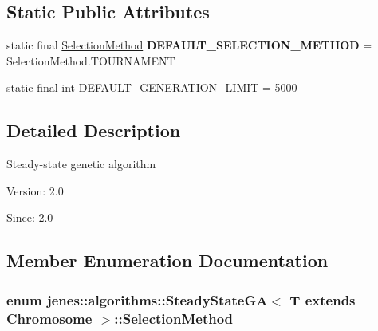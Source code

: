 \subsection*{Static Public Attributes}
\begin{CompactItemize}
\item 
\hypertarget{classjenes_1_1algorithms_1_1_steady_state_g_a_3_01_t_01extends_01_chromosome_01_4_6b63d4f31855f6b9f73d8e35cb76eaee}{
static final \hyperlink{classjenes_1_1algorithms_1_1_steady_state_g_a_3_01_t_01extends_01_chromosome_01_4_e3534264ad652fd69b6d2a619b16e13b}{SelectionMethod} \textbf{DEFAULT\_\-SELECTION\_\-METHOD} = SelectionMethod.TOURNAMENT}
\label{classjenes_1_1algorithms_1_1_steady_state_g_a_3_01_t_01extends_01_chromosome_01_4_6b63d4f31855f6b9f73d8e35cb76eaee}

\item 
static final int \hyperlink{classjenes_1_1algorithms_1_1_steady_state_g_a_3_01_t_01extends_01_chromosome_01_4_d510a7e4a856de7b2c9d021b2f66a5ac}{DEFAULT\_\-GENERATION\_\-LIMIT} = 5000
\end{CompactItemize}


\subsection{Detailed Description}
Steady-state genetic algorithm

\begin{Desc}
\item[Version:]2.0 \end{Desc}
\begin{Desc}
\item[Since:]2.0 \end{Desc}


\subsection{Member Enumeration Documentation}
\hypertarget{classjenes_1_1algorithms_1_1_steady_state_g_a_3_01_t_01extends_01_chromosome_01_4_e3534264ad652fd69b6d2a619b16e13b}{
\subsubsection[SelectionMethod]{\setlength{\rightskip}{0pt plus 5cm}enum jenes::algorithms::SteadyStateGA$<$ T extends Chromosome $>$::{\bf SelectionMethod}}}
\label{classjenes_1_1algorithms_1_1_steady_state_g_a_3_01_t_01extends_01_chromosome_01_4_e3534264ad652fd69b6d2a619b16e13b}


